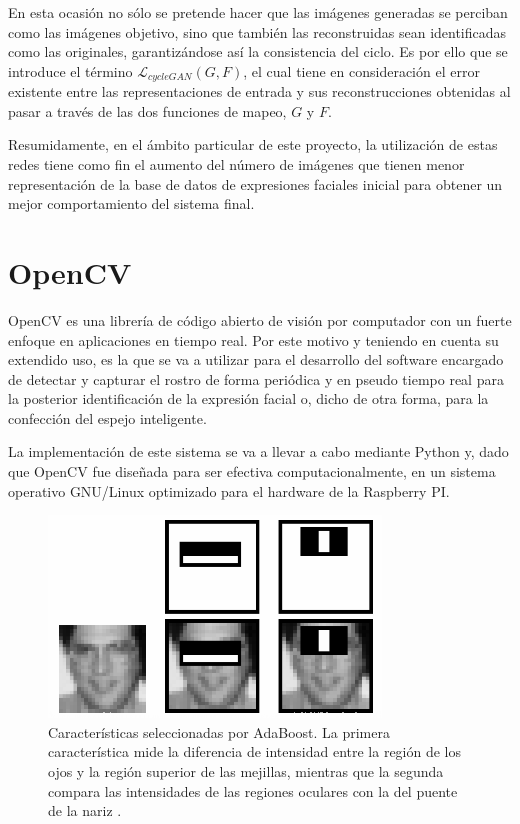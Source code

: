 En esta ocasión no sólo se pretende hacer que las imágenes generadas se perciban como las imágenes objetivo, sino que también las reconstruidas sean identificadas como las originales, garantizándose así la consistencia del ciclo. Es por ello que se introduce el término $\mathcal{L}_{cycleGAN}(G, F)$, el cual tiene en consideración el error existente entre las representaciones de entrada y sus reconstrucciones obtenidas al pasar a través de las dos funciones de mapeo, $G$ y $F$.

Resumidamente, en el ámbito particular de este proyecto, la utilización de estas redes tiene como fin el aumento del número de imágenes que tienen menor representación de la base de datos de expresiones faciales inicial para obtener un mejor comportamiento del sistema final.

\section{OpenCV}

OpenCV es una librería de código abierto de visión por computador con un fuerte enfoque en aplicaciones en tiempo real. Por este motivo y teniendo en cuenta su extendido uso, es la que se va a utilizar para el desarrollo del software encargado de detectar y capturar el rostro de forma periódica y en pseudo tiempo real para la posterior identificación de la expresión facial o, dicho de otra forma, para la confección del espejo inteligente.

La implementación de este sistema se va a llevar a cabo mediante Python y, dado que OpenCV fue diseñada para ser efectiva computacionalmente, en un sistema operativo GNU/Linux optimizado para el hardware de la Raspberry PI.

\begin{figure}
    \centering
    \includegraphics[scale=0.8]{Images/Haar.png}
    \caption{Características seleccionadas por AdaBoost. La primera característica mide la diferencia de intensidad entre la región de los ojos y la región superior de las mejillas, mientras que la segunda compara las intensidades de las regiones oculares con la del puente de la nariz \cite{Viola}.}
    \label{fig:Haar}
\end{figure}

